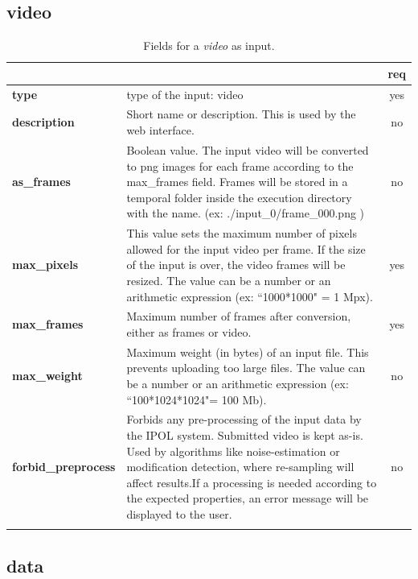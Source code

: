 \subsection{video}

\begin{longtable}{|>{\bf}L{\linewidth}|L{\linewidth}|c|}
\hline
{}     &  & {\bf req} \tabularnewline 
\hline \hline
 type         & type of the input: video & yes \\ \hline
 description  & Short name or description. This is used by the web interface. & no \\ \hline
 as\_frames & Boolean value. The input video will be converted to png images for each frame according to the max\_frames field. Frames
 will be stored in a temporal folder inside the execution directory with the name. (ex: ./input\_0/frame\_000.png ) & no \\ \hline
 max\_pixels   & This value sets the maximum number of pixels allowed for the input video per frame. If the size of the input is over, the video frames will be resized. The value can be a number or an arithmetic expression (ex: ``1000*1000" = 1 Mpx).  & yes \\ \hline 
 max\_frames  &  Maximum number of frames after conversion, either as frames or video.  & yes \\ \hline
 max\_weight   & Maximum weight (in bytes) of an input file. This prevents uploading too large files. The value can be a number or an arithmetic expression (ex: ``100*1024*1024"= 100 Mb). & no \\ \hline
forbid\_preprocess & Forbids any pre-processing of the input data by the IPOL system. Submitted video is kept as-is. Used by algorithms like noise-estimation or modification detection, where re-sampling will affect results.If a processing is needed according to the expected properties, an error message will be displayed to the user.
& no \\ \hline
\caption{Fields for a \emph{video} as input.}
\end{longtable}


\subsection{data}

